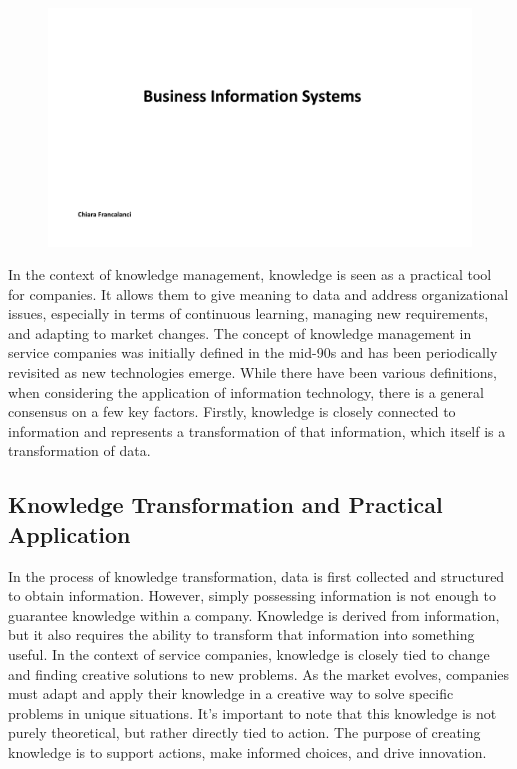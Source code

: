 \begin{figure}[!h]
  \centering
  \includegraphics[page=4, trim = 1.5cm 4cm 1.5cm 4.5cm, clip, width=\imagewidth]{images/05 - KM.pdf}
\end{figure}

In the context of knowledge management, knowledge is seen as a practical
tool for companies. It allows them to give meaning to data and address
organizational issues, especially in terms of continuous learning,
managing new requirements, and adapting to market changes. The concept
of knowledge management in service companies was initially defined in
the mid-90s and has been periodically revisited as new technologies
emerge. While there have been various definitions, when considering the
application of information technology, there is a general consensus on a
few key factors. Firstly, knowledge is closely connected to information
and represents a transformation of that information, which itself is a
transformation of data.

\subsection{Knowledge Transformation and Practical
  Application}\label{knowledge-transformation-and-practical-application}

In the process of knowledge transformation, data is first collected and
structured to obtain information. However, simply possessing information
is not enough to guarantee knowledge within a company. Knowledge is
derived from information, but it also requires the ability to transform
that information into something useful. In the context of service
companies, knowledge is closely tied to change and finding creative
solutions to new problems. As the market evolves, companies must adapt
and apply their knowledge in a creative way to solve specific problems
in unique situations. It's important to note that this knowledge is not
purely theoretical, but rather directly tied to action. The purpose of
creating knowledge is to support actions, make informed choices, and
drive innovation.

